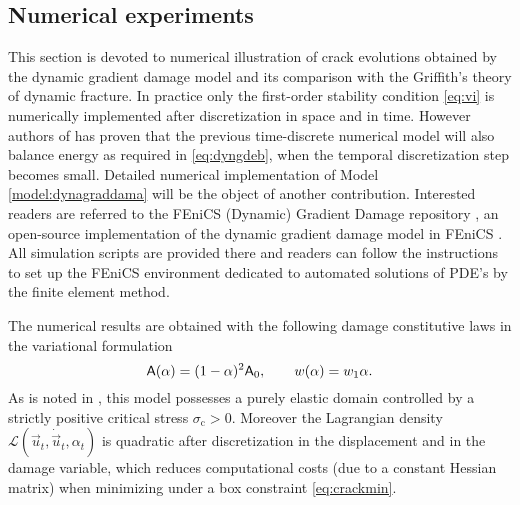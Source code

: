 \subsection{Numerical experiments} \label{sec:numerics}
This section is devoted to numerical illustration of crack evolutions obtained by the dynamic gradient damage model and its comparison with the Griffith's theory of dynamic fracture. In practice only the first-order stability condition \eqref{eq:vi} is numerically implemented after discretization in space and in time. However authors of \cite{LarsenOrtnerSuli:2010} has proven that the previous time-discrete numerical model will also balance energy as required in \eqref{eq:dyngdeb}, when the temporal discretization step becomes small. Detailed numerical implementation of Model \ref{model:dynagraddama} will be the object of another contribution. Interested readers are referred to the FEniCS (Dynamic) Gradient Damage repository \cite{LiMaurini:2015}, an open-source implementation of the dynamic gradient damage model in FEniCS \cite{LoggMardalWells:2012}. All simulation scripts are provided there and readers can follow the instructions to set up the FEniCS environment dedicated to automated solutions of PDE's by the finite element method.

The numerical results are obtained with the following damage constitutive laws in the variational formulation
\begin{equation} \label{eq:ourchoice}
\mathsf{A}(\alpha)=(1-\alpha)^2\mathsf{A}_0,\qquad w(\alpha)=w_1\alpha.
\end{equation}
As is noted in \cite{PhamAmorMarigoMaurini:2011}, this model possesses a purely elastic domain controlled by a strictly positive critical stress $\sigma_\mathrm{c}>0$. Moreover the Lagrangian density $\mathcal{L}(\vec{u}_t,\dot{\vec{u}}_t,\alpha_t)$ is quadratic after discretization in the displacement and in the damage variable, which reduces computational costs (due to a constant Hessian matrix) when minimizing under a box constraint \eqref{eq:crackmin}.

